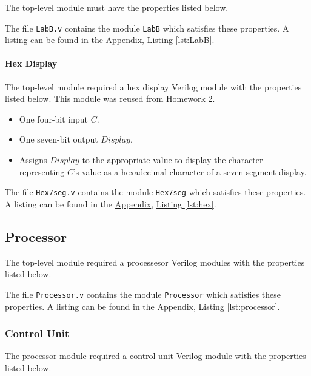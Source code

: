 The top-level module must have the properties listed below.


The file \verb|LabB.v| contains the module \verb|LabB| which satisfies these properties.
A listing can be found in the \hyperref[sec:appendix]{Appendix}, \hyperref[lst:LabB]{Listing \ref*{lst:LabB}}.

\paragraph{Hex Display} \label{par:hex}

The top-level module required a hex display Verilog module with the properties listed below.
This module was reused from Homework 2.

\begin{itemize}
    \item One four-bit input $C$.
    \item One seven-bit output $Display$.
    \item Assigns $Display$ to the appropriate value to display the character representing $C$'s value as a hexadecimal character of a seven segment display.
\end{itemize}

The file \verb|Hex7seg.v| contains the module \verb|Hex7seg| which satisfies these properties.
A listing can be found in the \hyperref[sec:appendix]{Appendix}, \hyperref[lst:hex]{Listing \ref*{lst:hex}}.

\subsection{Processor}  \label{subsec:processor}

The top-level module required a processesor Verilog modules with the properties listed below.


The file \verb|Processor.v| contains the module \verb|Processor| which satisfies these properties.
A listing can be found in the \hyperref[sec:appendix]{Appendix}, \hyperref[lst:processor]{Listing \ref*{lst:processor}}.

\subsubsection{Control Unit} \label{subsub:controlunit}

The processor module required a control unit Verilog module with the properties listed below.

